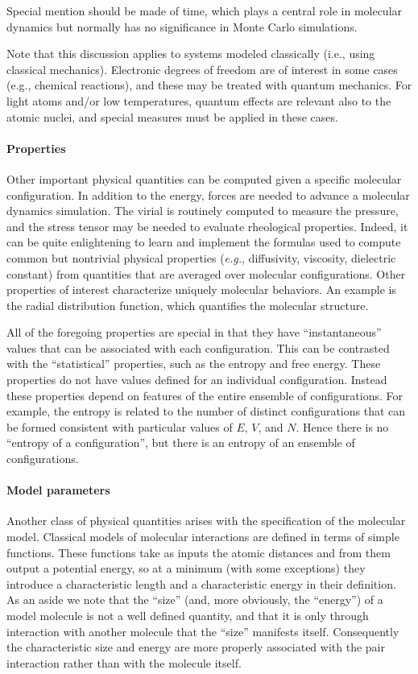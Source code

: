 \documentclass[]{article}
\let\oldparagraph\paragraph
\renewcommand{\paragraph}[1]{\oldparagraph{#1}\mbox{}}
\begin{document}
Special mention should be made of time, which plays a central role in
molecular dynamics but normally has no significance in Monte Carlo
simulations.

Note that this discussion applies to systems modeled
classically (i.e., using classical mechanics). Electronic degrees of freedom
are of interest in some cases (e.g., chemical reactions), and these may be 
treated with quantum mechanics. For light atoms and/or low temperatures, 
quantum effects are relevant also to the atomic nuclei, and special measures
must be applied in these cases.

\paragraph{Properties}\label{properties}

Other important physical quantities can be computed given a specific
molecular configuration. In addition to the energy, forces are needed to advance a molecular dynamics simulation.
The virial is routinely computed to measure the pressure, and the stress
tensor may be needed to evaluate rheological properties. Indeed, it can
be quite enlightening to learn and implement the formulas used to
compute common but nontrivial physical properties (\emph{e.g.},
diffusivity, viscosity, dielectric constant) from quantities that are
averaged over molecular configurations. Other properties of interest
characterize uniquely molecular behaviors. An example is the radial
distribution function, which quantifies the molecular structure.

All of the foregoing properties are special in that they have
``instantaneous'' values that can be associated with each configuration.
This can be contrasted with the ``statistical'' properties, such as the
entropy and free energy. These properties do not have values
defined for an individual configuration. Instead these properties depend
on features of the entire ensemble of configurations. For example, the
entropy is related to the number of distinct configurations that can be
formed consistent with particular values of $E$, $V$, and $N$. Hence there is
no ``entropy of a configuration'', but there is an entropy of an
ensemble of configurations.

\paragraph{Model parameters}\label{model-parameters}

Another class of physical quantities arises with the specification of
the molecular model. Classical models of molecular interactions are
defined in terms of simple functions. These functions take as inputs the
atomic distances and from them output a potential energy, so at a
minimum (with some exceptions) they introduce a characteristic length
and a characteristic energy in their definition. As an aside we note
that the ``size'' (and, more obviously, the ``energy'') of a model
molecule is not a well defined quantity, and that it is only through
interaction with another molecule that the ``size'' manifests itself.
Consequently the characteristic size and energy are more properly
associated with the pair interaction rather than with the molecule
itself.
\end{document}
